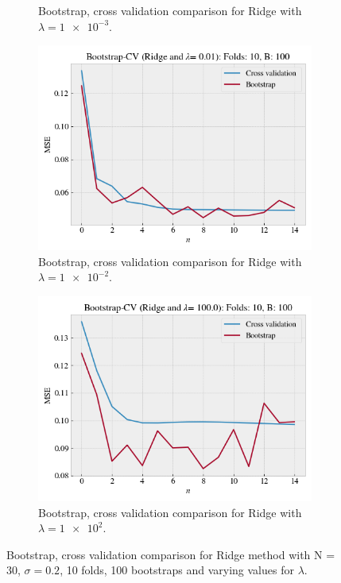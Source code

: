 \documentclass[norsk,a4paper,12pt]{scrartcl}
\begin{document}
\begin{figure}[H]
\begin{subfigure}[b]{0.49\textwidth}
        \caption{Bootstrap, cross validation comparison for Ridge with $\lambda = \num{1e-3}$.}
    \label{fig:CV_B_Ridge001}
     \end{subfigure}
    \begin{subfigure}[b]{0.49\textwidth}
         \centering
         \includegraphics[width=\textwidth]{figures/CV_B_Ridge_01.png}
          \caption{Bootstrap, cross validation comparison for Ridge with $\lambda = \num{1e-2}$.}
          \label{fig:CV_B_Ridge01}
     \end{subfigure}
     \hfill
     \begin{subfigure}[b]{0.49\textwidth}
         \centering
         \includegraphics[width=\textwidth]{figures/CV_B_Ridge_100.png}
         \caption{Bootstrap, cross validation comparison for Ridge with $\lambda = \num{1e2}$.   }
        \label{fig:fig:CV_B_Ridge1}
     \end{subfigure}
    \caption{Bootstrap, cross validation comparison for Ridge method with N = 30, $\sigma = 0.2$, 10 folds, 100 bootstraps and varying values for $\lambda$.}
    \label{fig:CV_B_Ridge}
\end{figure}
\end{document}
